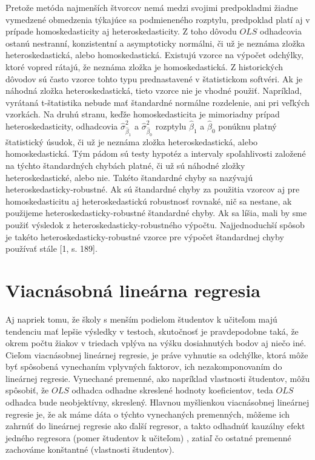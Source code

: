\documentclass[]{tukediphc}
\begin{document}
Pretože metóda najmenších štvorcov nemá medzi svojimi predpokladmi žiadne vymedzené obmedzenia týkajúce sa podmieneného rozptylu, predpoklad platí aj v prípade homoskedasticity aj heteroskedasticity. Z toho dôvodu $OLS$ odhadcovia ostanú nestranní, konzistentní a asymptoticky normálni, či už je neznáma zložka heteroskedastická, alebo homoskedastická. Existujú vzorce na výpočet odchýlky, ktoré vopred rátajú, že neznáma zložka je homoskedastická. Z historických dôvodov sú často vzorce tohto typu prednastavené v štatistickom softvéri. Ak je náhodná zložka heteroskedastická, tieto vzorce nie je vhodné použiť. Napríklad, vyrátaná t-štatistika nebude mať štandardné normálne rozdelenie, ani pri veľkých vzorkách. Na druhú stranu, keďže homoskedasticita je mimoriadny prípad heteroskedasticity, odhadcovia $\hat\sigma^2_{\hat\beta_{1}}$ a $\hat\sigma^2_{\hat\beta_{0}}$ rozptylu $\hat\beta_{1}$ a $\hat\beta_{0}$ ponúknu platný štatistický úsudok, či už je neznáma zložka heteroskedastická, alebo homoskedastická. Tým pádom sú testy hypotéz a intervaly spoľahlivosti založené na týchto štandardných chybách platné, či už sú náhodné zložky heteroskedastické, alebo nie. Takéto štandardné chyby sa nazývajú heteroskedasticky-robustné. Ak sú štandardné chyby za použitia vzorcov aj pre homoskedasticitu aj heteroskedastickú robustnosť rovnaké, nič sa nestane, ak použijeme heteroskedasticky-robustné štandardné chyby. Ak sa líšia, mali by sme použiť výsledok z heteroskedasticky-robustného výpočtu. Najjednoduchší spôsob je takéto heteroskedasticky-robustné vzorce pre výpočet štandardnej chyby používať stále [1, s. 189]. 

\newpage
\section{Viacnásobná lineárna regresia}

Aj napriek tomu, že školy s menším podielom študentov k učiteľom majú tendenciu mať lepšie výsledky v testoch, skutočnosť je pravdepodobne taká, že okrem počtu žiakov v triedach vplýva na výšku dosiahnutých bodov aj niečo iné. Cieľom viacnásobnej lineárnej regresie, je práve vyhnutie sa odchýlke, ktorá môže byť spôsobená vynechaním vplyvných faktorov, ich  nezakomponovaním do lineárnej regresie. Vynechané premenné, ako napríklad vlastnosti študentov, môžu spôsobiť, že $OLS$ odhadca odhadne skreslené hodnoty koeficientov, teda $OLS$ odhadca bude neobjektívny, skreslený. Hlavnou myšlienkou viacnásobnej lineárnej regresie je, že ak máme dáta o týchto vynechaných premenných, môžeme ich zahrnúť do lineárnej regresie ako ďalší regresor, a takto odhadnúť kauzálny efekt jedného regresora (pomer študentov k učiteľom) , zatiaľ čo ostatné premenné zachováme konštantné (vlastnosti študentov). 
\end{document}

